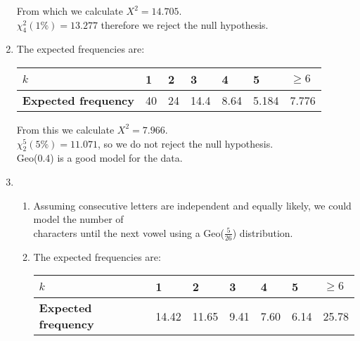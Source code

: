 \documentclass[fleqn]{article}
\begin{document}
\begin{enumerate}
        From which we calculate $X^2=14.705$. \\
        $\chi_4^2(1\%)=13.277$ therefore we reject the null hypothesis.
    \item The expected frequencies are: \vspace{2mm}\\
        \begin{tabularx}{0.73\textwidth}{|X|*6{P{12mm}|}}
            \hline
            \textbf{$k$}                  & 1  & 2  & 3    & 4    & 5     & $\geq6$     \\\hline
            \textbf{Expected frequency}   & 40 & 24 & 14.4 & 8.64 & 5.184 & 7.776       \\\hline
        \end{tabularx}\vspace{4mm}
        
        From this we calculate $X^2=7.966$.                              \\
        $\chi_2^5(5\%)=11.071$, so we do not reject the null hypothesis. \\
        Geo(0.4) is a good model for the data.
    \item \begin{enumerate}[label=\bfseries \alph*\space ]
            \item Assuming consecutive letters are independent and equally likely, we could model the number of \\characters until the next vowel using a Geo($\tfrac{5}{26}$) distribution.
            \item The expected frequencies are: \vspace{2mm}\\
                \begin{tabularx}{0.73\textwidth}{|X|*6{P{12mm}|}}
                    \hline
                    \textbf{$k$}                  & 1     & 2     & 3    & 4    & 5    & $\geq6$     \\\hline
                    \textbf{Expected frequency}   & 14.42 & 11.65 & 9.41 & 7.60 & 6.14 & 25.78       \\\hline
                \end{tabularx}\vspace{4mm}
                

\end{enumerate}
\end{enumerate}
\end{document}
